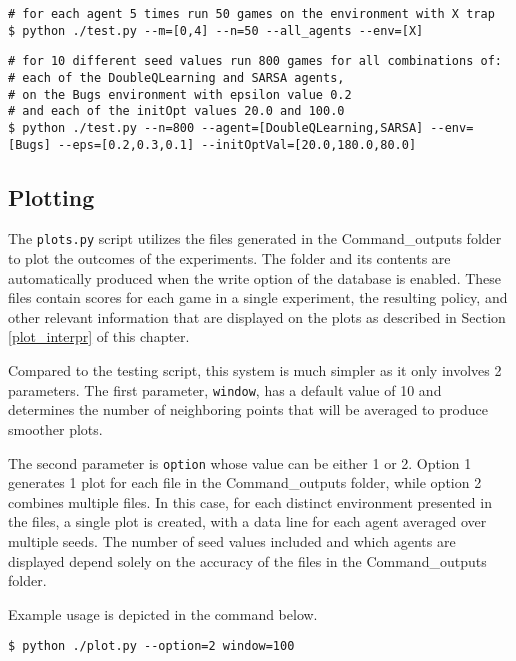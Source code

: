 \begin{center}
\hrulefill
\begin{lstlisting}
# for each agent 5 times run 50 games on the environment with X trap
$ python ./test.py --m=[0,4] --n=50 --all_agents --env=[X]
\end{lstlisting}
\hrulefill
\end{center}

\begin{center}
\hrulefill
\begin{lstlisting}
# for 10 different seed values run 800 games for all combinations of:
# each of the DoubleQLearning and SARSA agents,
# on the Bugs environment with epsilon value 0.2
# and each of the initOpt values 20.0 and 100.0
$ python ./test.py --n=800 --agent=[DoubleQLearning,SARSA] --env=[Bugs] --eps=[0.2,0.3,0.1] --initOptVal=[20.0,180.0,80.0]
\end{lstlisting}
\hrulefill
\end{center}

\subsection{Plotting}

The \texttt{plots.py} script utilizes the files generated in the Command\_outputs folder to plot the outcomes of the experiments. The folder and its contents are automatically produced when the write option of the database is enabled. These files contain scores for each game in a single experiment, the resulting policy, and other relevant information that are displayed on the plots as described in Section \ref{plot_interpr} of this chapter.

Compared to the testing script, this system is much simpler as it only involves 2 parameters. The first parameter, \texttt{window}, has a default value of 10 and determines the number of neighboring points that will be averaged to produce smoother plots.

The second parameter is \texttt{option} whose value can be either 1 or 2. Option 1 generates 1 plot for each file in the Command\_outputs folder, while option 2 combines multiple files. In this case, for each distinct environment presented in the files, a single plot is created, with a data line for each agent averaged over multiple seeds. The number of seed values included and which agents are displayed depend solely on the accuracy of the files in the Command\_outputs folder.

Example usage is depicted in the command below.

\begin{center}
\hrulefill
\begin{lstlisting}
$ python ./plot.py --option=2 window=100
\end{lstlisting}
\hrulefill
\end{center}
